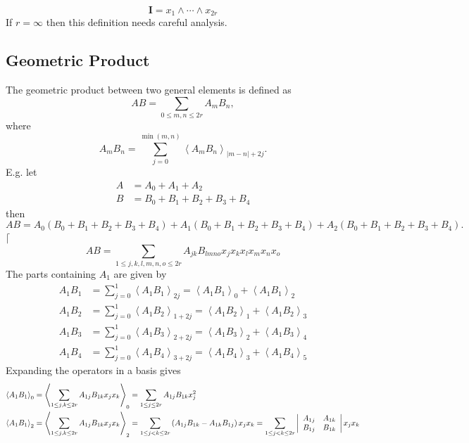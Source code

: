 \documentclass[aps,preprint]{revtex4}%
\begin{document}
\begin{equation}
\mathbf{I}=x_{1}\wedge\cdots\wedge x_{2r}%
\end{equation}
If $r=\infty$ then this definition needs careful analysis.

\subsection{Geometric Product}

The geometric product between two general elements is defined as
\begin{equation}
AB=\sum_{0\leq m,n\leq2r}A_{m}B_{n},
\end{equation}
where
\begin{equation}
A_{m}B_{n}=\sum_{j=0}^{\min\left(  m,n\right)  }\left\langle A_{m}%
B_{n}\right\rangle _{\left\vert m-n\right\vert +2j}.
\end{equation}
E.g. let
\begin{align}
A  &  =A_{0}+A_{1}+A_{2}\\
B  &  =B_{0}+B_{1}+B_{2}+B_{3}+B_{4}%
\end{align}
then
\begin{equation}
AB=A_{0}\left(  B_{0}+B_{1}+B_{2}+B_{3}+B_{4}\right)  +A_{1}\left(
B_{0}+B_{1}+B_{2}+B_{3}+B_{4}\right)  +A_{2}\left(  B_{0}+B_{1}+B_{2}%
+B_{3}+B_{4}\right)  .
\end{equation}
$\lceil$%
\begin{equation}
AB=\sum_{1\leq j,k,l,m,n,o\leq2r}A_{jk}B_{lmno}x_{j}x_{k}x_{l}x_{m}x_{n}x_{o}%
\end{equation}
The parts containing $A_{1}$ are given by
\begin{align}
A_{1}B_{1}  &  =\sum_{j=0}^{1}\left\langle A_{1}B_{1}\right\rangle
_{2j}=\left\langle A_{1}B_{1}\right\rangle _{0}+\left\langle A_{1}%
B_{1}\right\rangle _{2}\\
A_{1}B_{2}  &  =\sum_{j=0}^{1}\left\langle A_{1}B_{2}\right\rangle
_{1+2j}=\left\langle A_{1}B_{2}\right\rangle _{1}+\left\langle A_{1}%
B_{2}\right\rangle _{3}\\
A_{1}B_{3}  &  =\sum_{j=0}^{1}\left\langle A_{1}B_{3}\right\rangle
_{2+2j}=\left\langle A_{1}B_{3}\right\rangle _{2}+\left\langle A_{1}%
B_{3}\right\rangle _{4}\\
A_{1}B_{4}  &  =\sum_{j=0}^{1}\left\langle A_{1}B_{4}\right\rangle
_{3+2j}=\left\langle A_{1}B_{4}\right\rangle _{3}+\left\langle A_{1}%
B_{4}\right\rangle _{5}%
\end{align}
Expanding the operators in a basis gives
\begin{align}
\left\langle A_{1}B_{1}\right\rangle _{0}  &  =\left\langle \sum_{1\leq
j,k\leq2r}A_{1j}B_{1k}x_{j}x_{k}\right\rangle _{0}=\sum_{1\leq j\leq2r}%
A_{1j}B_{1k}x_{j}^{2}\\
\left\langle A_{1}B_{1}\right\rangle _{2}  &  =\left\langle \sum_{1\leq
j,k\leq2r}A_{1j}B_{1k}x_{j}x_{k}\right\rangle _{2}=\sum_{1\leq j<k\leq
2r}\left(  A_{1j}B_{1k}-A_{1k}B_{1j}\right)  x_{j}x_{k}=\sum_{1\leq j<k\leq
2r}\left\vert
\begin{array}
[c]{cc}%
A_{1j} & A_{1k}\\
B_{1j} & B_{1k}%
\end{array}
\right\vert x_{j}x_{k}%
\end{align}%
\end{document}
